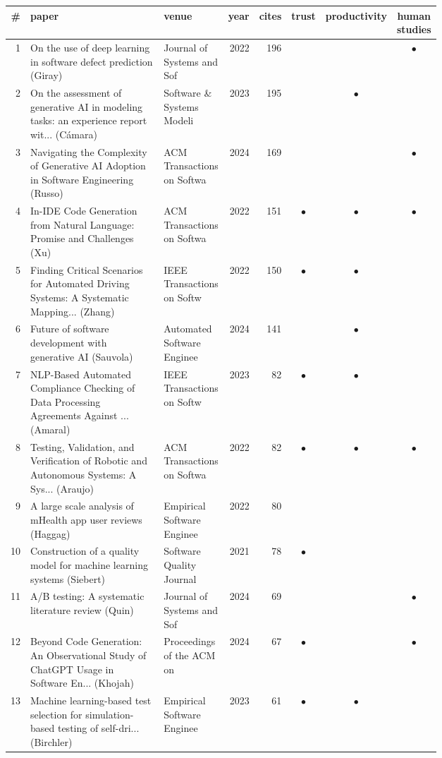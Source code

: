 \begin{tabular}{@{}rp{0.56\linewidth}p{0.15\linewidth}rrccc@{}}
\toprule
\# & paper & venue & year & cites & trust & productivity & human studies\\
\midrule
1 & On the use of deep learning in software defect prediction (Giray) & Journal of Systems and Sof & 2022 & 196 &  &  & $\bullet$\\
2 & On the assessment of generative AI in modeling tasks: an experience report wit... (Cámara) & Software \& Systems Modeli & 2023 & 195 &  & $\bullet$ & \\
3 & Navigating the Complexity of Generative AI Adoption in Software Engineering (Russo) & ACM Transactions on Softwa & 2024 & 169 &  &  & $\bullet$\\
4 & In-IDE Code Generation from Natural Language: Promise and Challenges (Xu) & ACM Transactions on Softwa & 2022 & 151 & $\bullet$ & $\bullet$ & $\bullet$\\
5 & Finding Critical Scenarios for Automated Driving Systems: A Systematic Mapping... (Zhang) & IEEE Transactions on Softw & 2022 & 150 & $\bullet$ & $\bullet$ & \\
6 & Future of software development with generative AI (Sauvola) & Automated Software Enginee & 2024 & 141 &  & $\bullet$ & \\
7 & NLP-Based Automated Compliance Checking of Data Processing Agreements Against ... (Amaral) & IEEE Transactions on Softw & 2023 & 82 & $\bullet$ & $\bullet$ & \\
8 & Testing, Validation, and Verification of Robotic and Autonomous Systems: A Sys... (Araujo) & ACM Transactions on Softwa & 2022 & 82 & $\bullet$ & $\bullet$ & $\bullet$\\
9 & A large scale analysis of mHealth app user reviews (Haggag) & Empirical Software Enginee & 2022 & 80 &  &  & \\
10 & Construction of a quality model for machine learning systems (Siebert) & Software Quality Journal & 2021 & 78 & $\bullet$ &  & \\
11 & A/B testing: A systematic literature review (Quin) & Journal of Systems and Sof & 2024 & 69 &  &  & $\bullet$\\
12 & Beyond Code Generation: An Observational Study of ChatGPT Usage in Software En... (Khojah) & Proceedings of the ACM on  & 2024 & 67 & $\bullet$ &  & $\bullet$\\
13 & Machine learning-based test selection for simulation-based testing of self-dri... (Birchler) & Empirical Software Enginee & 2023 & 61 & $\bullet$ & $\bullet$ & \\

\end{tabular}
